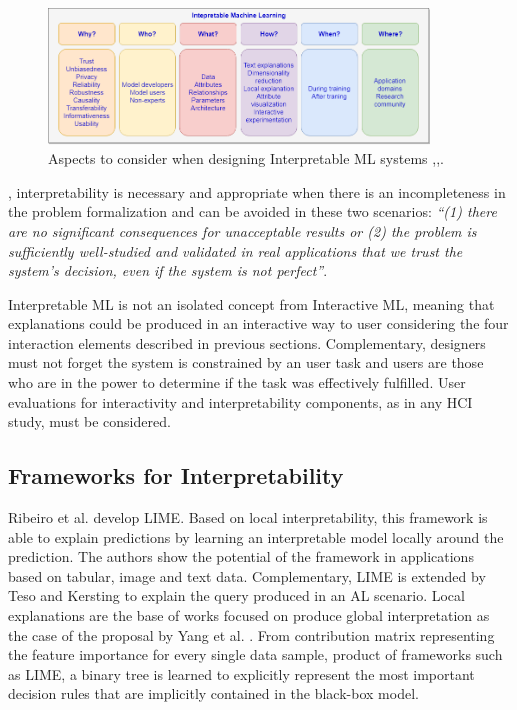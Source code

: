 \begin{figure}[ht]
 \centering
 \includegraphics[width=0.9\textwidth]{InterpretableML.png}
 \caption{Aspects to consider when designing Interpretable ML systems \cite{Hohman2018},\cite{Doshi-Velez2017c},\cite{Lipton2017}.}
 \label{fig:interpretableML}
\end{figure}

, interpretability is necessary and appropriate when there is an incompleteness in the problem formalization and can be avoided in these two scenarios: \textit{``(1) there are no significant consequences for unacceptable results or (2) the problem is sufficiently well-studied and validated in real applications that we trust the system’s decision, even if the system is not perfect''}.


Interpretable ML is not an isolated concept from Interactive ML, meaning that explanations could be produced in an interactive way to user considering the four interaction elements described in previous sections. Complementary, designers must not forget the system is constrained by an user task and users are those who are in the power to determine if the task was effectively fulfilled. User evaluations for interactivity and interpretability components, as in any HCI study, must be considered.

\subsection{Frameworks for Interpretability}

Ribeiro et al. \cite{Ribeiro2016} develop LIME. Based on local interpretability, this framework is able to explain predictions by learning an interpretable model locally around the prediction. The authors show the potential of the framework in applications based on tabular, image and text data. Complementary, LIME is extended by Teso and Kersting \cite{Teso2018WhyUsers} to explain the query produced in an AL scenario. Local explanations are the base of works focused on produce global interpretation as the case of the proposal by Yang et al. \cite{Yang2018GlobalPartitioning}. From contribution matrix representing the feature importance for every single data sample, product of frameworks such as LIME, a binary tree is learned to explicitly represent the most important decision rules that are implicitly contained in the black-box model. 

